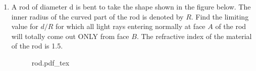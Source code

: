 \documentclass{zc-ust-hw}
\newcommand{\incfig}[1]{%
    \def\svgwidth{\columnwidth}
    {#1.pdf_tex}
}
\begin{document}
\begin{enumerate}
    \begin{figure}[ht]
      \centering
      \incfig{globe}
      \caption{}
      \label{fig:globe}
    \end{figure}

    \begin{sol}
      \begin{align}
        n(r) &= 1 + \rho e^{-\frac{r-R}{8700}} \\
        \frac{dn}{dr} &= -\frac{\rho}{8700} e^{-\frac{r-R}{8700}}
      .\end{align}
      \begin{align}
        l &= n(r)r\theta \\
        \frac{dl}{dr} &= \frac{dn}{dr}r\theta + n(r)\theta
      \end{align}
      \begin{equation}
        \implies \frac{dn}{dr}= -\frac{n(r)}{r}
      .\end{equation}
      \begin{equation}
        \frac{n(r)}{r} = \frac{\rho}{8700} e^{-\frac{r-R}{8700}}
      .\end{equation}
      \begin{equation}
        r=R=6.4\times 10^{6} \implies \frac{\rho \times 6.4\times 10^{6}}{8700} = 1 + \rho \implies \rho = 1.36 \times 10^{-3}
      \end{equation}
      \begin{equation}
        n_0 - 1 = \rho_0 \implies \rho_0 = 3 \times 10^{-4}
      .\end{equation}
      \begin{equation}
        \frac{\rho}{\rho_0} = \frac{1.36 \times 10^{-3}}{3 \times 10^{-4}} = 4.53
      \end{equation}
    \end{sol}

  \item A rod of diameter d is bent to take the shape shown in the figure
    below. The inner radius of the curved part of the rod is denoted by $R$. Find
    the limiting value for $d/R$ for which all light rays entering normally at
    face $A$ of the rod will totally come out ONLY from face $B$. The refractive
    index of the material of the rod is 1.5.

    \begin{figure}[ht]
      \centering
      \incfig{rod}
      \caption{}
      \label{fig:rod}
    \end{figure}


\end{enumerate}
\end{document}
